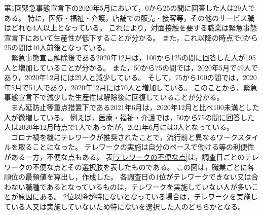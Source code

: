\documentclass[paper={210mm,297mm},line_length=35zw,number_of_lines=31,head_space=30mm,gutter=40mm,baselineskip=2.0zw,headfoot_verticalposition=1.5zw]{jlreq} %
\begin{document}
第1回緊急事態宣言下の2020年5月において，0から25の間に回答した人は29人である。
特に，医療・福祉・介護，店舗での販売・接客等，その他のサービス職はどれも4人以上となっている。
これにより，対面接触を要する職業は緊急事態宣言下において生産性が低下することが分かる。
また，これ以降の時点で0から25の間は10人前後となっている。\\
　緊急事態宣言解除後である2020年12月は，100から125の間に回答した人が195人と増加していることが分かる。
また，50から75の間では，2020年5月で49人であり，2020年12月には29人と減少している。
そして，75から100の間では，2020年5月で51人であり，2020年12月には70人と増加している。
このことから，緊急事態宣言下で減少した生産性は解除後に回復していることが分かる。\\
　まん延防止等重点措置下である2021年6月は，2020年12月と比べ100未満とした人が微増している。
例えば，医療・福祉・介護では，50から75の間に回答した人は2020年12月時点で1人であったが，2021年6月には3人となっている。\\
　コロナ禍を機にテレワークが推奨されたことで，流行前と異なるワークスタイルを取ることになった。
テレワークの実施は自分のペースで働ける等の利便性がある一方，不便な点もある。
表\ref{テレワークの不便な点}は，調査日ごとのテレワークの不便な点とその選択肢を表したものである。
この図は，職業ごとに各順位の最頻値を算出し，作成した。
各調査日の1位がテレワークできない又は合わない職種であるとなっているものは，テレワークを実施していない人が多いことが原因にある。
2位以降が特にないとなっている場合は，テレワークを実施している人又は実施していないため特にないを選択した人のどちらかとなる。\\
\end{document}

